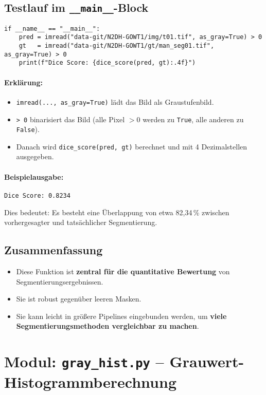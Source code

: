 \documentclass[a4paper,12pt]{article}
\begin{document}
\subsection*{Testlauf im \texttt{\_\_main\_\_}-Block}
\begin{verbatim}
if __name__ == "__main__":
    pred = imread("data-git/N2DH-GOWT1/img/t01.tif", as_gray=True) > 0
    gt   = imread("data-git/N2DH-GOWT1/gt/man_seg01.tif", as_gray=True) > 0
    print(f"Dice Score: {dice_score(pred, gt):.4f}")
\end{verbatim}

\paragraph{Erklärung:}
\begin{itemize}
  \item \texttt{imread(..., as\_gray=True)} lädt das Bild als Graustufenbild.
  \item \texttt{> 0} binarisiert das Bild (alle Pixel $> 0$ werden zu \texttt{True}, alle anderen zu \texttt{False}).
  \item Danach wird \texttt{dice\_score(pred, gt)} berechnet und mit 4 Dezimalstellen ausgegeben.
\end{itemize}

\paragraph{Beispielausgabe:}
\begin{verbatim}
Dice Score: 0.8234
\end{verbatim}
Dies bedeutet: Es besteht eine Überlappung von etwa 82{,}34\,\% zwischen vorhergesagter und tatsächlicher Segmentierung.

\subsection*{Zusammenfassung}
\begin{itemize}
  \item Diese Funktion ist \textbf{zentral für die quantitative Bewertung} von Segmentierungsergebnissen.
  \item Sie ist robust gegenüber leeren Masken.
  \item Sie kann leicht in größere Pipelines eingebunden werden, um \textbf{viele Segmentierungsmethoden vergleichbar zu machen}.
\end{itemize}

\section{Modul: \texttt{gray\_hist.py} – Grauwert-Histogrammberechnung}
\end{document}
